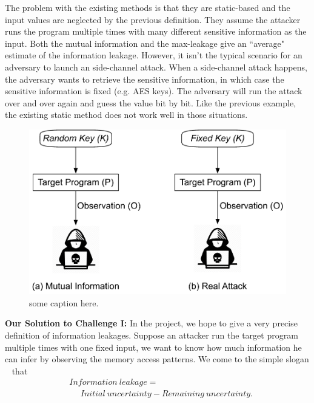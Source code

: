 The problem with the existing methods is that they are static-based and the 
input values are neglected by the previous definition. 
They assume the attacker runs the program multiple times with many different sensitive 
information as the input. Both the mutual information and the max-leakage give an ``average" 
estimate of the information leakage. However, it isn't the typical scenario for an adversary to 
launch an side-channel attack. When a side-channel attack happens, the adversary wants 
to retrieve the sensitive information, in which case the sensitive information is fixed (e.g. AES keys). 
The adversary will run the attack over and over again and guess the value bit by bit. Like the 
previous example, the existing static method does not work well in those situations.

\begin{figure}
  \centering
   \includegraphics[width=.9\columnwidth]{./figures/RA.pdf}
   \caption{some caption here. }
\end{figure}

\vspace*{6pt}
\textbf{Our Solution to Challenge I:}
In the project, we hope to give a very precise definition of information leakages. 
Suppose an attacker run the target program multiple times with one fixed input, we
want to know how much information he can infer by observing the memory access patterns.
We come to the simple slogan ~\cite{10.1007/978-3-642-00596-1_21} %
that
\begin{align*}
 & \mathit{Information\ leakage} = \\
 & ~~~~~~ \mathit{Initial}\ \mathit{uncertainty} - \mathit{Remaining\ uncertainty}. 
\end{align*}


